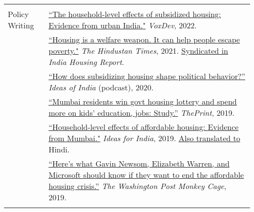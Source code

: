 \documentclass[letterpaper, 10pt]{article}
\begin{document}
\begin{longtable}{p{1in}p{5.5in}}
& \\


Policy Writing & \href{https://voxdev.org/topic/infrastructure-urbanisation/household-level-effects-subsidised-housing-evidence-urban-india?utm_source=dlvr.it&utm_medium=twitter}{``The household-level effects of subsidized housing: Evidence from urban India."} \textit{VoxDev}, 2022.\\
& \href{https://www.hindustantimes.com/opinion/housing-is-a-welfare-weapon-it-can-help-people-escape-poverty-101629993983576.html}{``Housing is a welfare weapon. It can help people escape poverty."} \textit{The Hindustan Times}, 2021. \href{https://indiahousingreport.in/outputs/opinion/housing-is-a-welfare-weapon-it-can-help-people-escape-poverty/}{Syndicated in} \textit{India Housing Report}. \\ 

&   \href{https://www.discoursemagazine.com/politics/2020/12/24/ideas-of-india-how-does-subsidizing-housing-prices-shape-political-behavior}{``How does subsidizing housing shape political behavior?''} \textit{Ideas of India} (podcast), 2020.\\


& \href{https://theprint.in/opinion/mumbai-residents-win-govt-housing-lottery-and-spend-more-on-kids-education-jobs-study/290485/}{``Mumbai residents win govt housing lottery and spend more on kids' education, jobs: Study.''} \textit{ThePrint}, 2019. \\

&\href{https://www.ideasforindia.in/topics/poverty-inequality/household-level-effects-of-affordable-housing-evidence-from-mumbai.html}{``Household-level effects of affordable housing: Evidence from Mumbai."} \textit{Ideas for India}, 2019.  \href{https://www.ideasforindia.in/topics/poverty-inequality/household-level-effects-of-affordable-housing-evidence-from-mumbai-hindi.html}{Also translated to} Hindi.\\



& \href{https://www.washingtonpost.com/news/monkey-cage/wp/2019/01/31/heres-what-gavin-newsom-elizabeth-warren-and-microsoft-should-know-if-want-to-end-the-affordable-housing-crisis/?tid=sm_tw_cage}{``Here's what Gavin Newsom, Elizabeth Warren, and Microsoft should know if they want to end the affordable housing crisis.''} \textit{The Washington Post Monkey Cage}, 2019.\\



&\\





\end{longtable}
\end{document}
